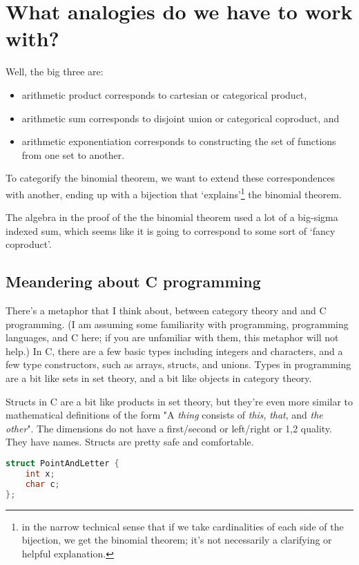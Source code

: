 \documentclass{proc-l}
\theoremstyle{definition}
\theoremstyle{remark}
\numberwithin{equation}{section}
\begin{document}
\section{What analogies do we have to work with?}

Well, the big three are:
\begin{itemize}
    \item arithmetic product corresponds to cartesian or categorical product,
    \item arithmetic sum corresponds to disjoint union or categorical coproduct, and
    \item arithmetic exponentiation corresponds to constructing the set of functions from one set to another.
\end{itemize}

To categorify the binomial theorem, we want to extend these correspondences with another, ending up with a bijection that `explains'\footnote{in the narrow technical sense that if we take cardinalities of each side of the bijection, we get the
binomial theorem; it's not necessarily a clarifying or helpful explanation.}
the binomial theorem.

The algebra in the proof of the the binomial theorem used a lot of a big-sigma indexed sum, which seems like it is going to correspond to some sort of `fancy coproduct'.

\subsection{Meandering about C programming}

There's a metaphor that I think about, between category theory and and C programming.
(I am assuming some familiarity with programming, programming languages, and C here;
if you are unfamiliar with them, this metaphor will not help.)
In C, there are a few basic types including integers and characters, and a few type constructors, such as arrays,
structs, and unions. Types in programming are a bit like sets in set theory, and a bit like objects in category theory.

Structs in C are a bit like products in set theory, but they're even more similar to mathematical definitions of the form "A \emph{thing} consists of \emph{this}, \emph{that}, and \emph{the other}". The dimensions do not have a first/second or left/right or 1,2 quality. They have names. Structs are pretty safe and comfortable. 

\begin{lstlisting}[language=C]
struct PointAndLetter {
    int x;
    char c;
};
\end{lstlisting}
\end{document}
